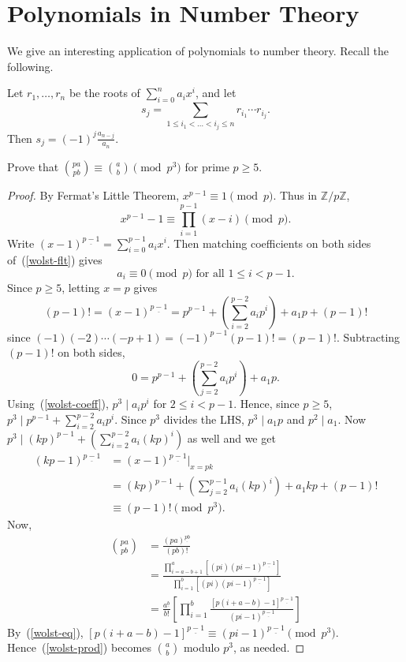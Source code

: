 \section{Polynomials in Number Theory}\label{poly2s3}
We give an interesting application of polynomials to number theory. Recall the following.
\begin{thm}
Let $r_1,\ldots, r_n$ be the roots of $\sum_{i=0}^n a_ix^i$, and let \[s_j=\sum_{1\leq i_1<\ldots<i_j\leq n}r_{i_1}\cdots r_{i_j}.\] Then $s_j=(-1)^j\frac{a_{n-j}}{a_n}$.
\end{thm}
\begin{thm}[Wolstenholme]
Prove that $\binom{pa}{pb}\equiv \binom{a}{b}\pmod{p^3}$ for prime $p\geq 5$.
\end{thm}
\begin{proof}
By Fermat's Little Theorem, $x^{p-1}\equiv 1\pmod{p}$. Thus in $\mathbb{Z}/p\mathbb{Z}$, \begin{equation}
x^{p-1}-1\equiv \prod_{i=1}^{p-1} (x-i)\pmod{p}.\label{wolst-flt}
\end{equation}
Write $(x-1)^{\underline{p-1}}=\sum_{i=0}^{p-1} a_ix^i$. Then matching coefficients on both sides of~(\ref{wolst-flt}) gives
\begin{equation}
a_i\equiv 0\pmod{p}\text{ for all }1\leq i<p-1.
\label{wolst-coeff}
\end{equation}
Since $p\geq 5$, letting $x=p$ gives
\[(p-1)!=(x-1)^{\underline{p-1}}=p^{p-1}+\left(\sum_{i=2}^{p-2} a_ip^i\right)+a_1p+(p-1)!\]
since $(-1)(-2)\cdots (-p+1)=(-1)^{p-1}(p-1)!=(p-1)!$. Subtracting $(p-1)!$ on both sides,
\[0=p^{p-1}+\left(\sum_{j=2}^{p-2} a_ip^i\right)+a_1p.\]
Using~(\ref{wolst-coeff}), $p^3\mid a_ip^i$ for $2\leq i<p-1$. Hence, since $p\geq 5$, $p^3\mid p^{p-1} +\sum_{i=2}^{p-2} a_ip^i$. Since $p^3$ divides the LHS, $p^3\mid a_1p$ and $p^2\mid a_1$. Now  $p^3\mid(kp)^{p-1}+\left( \sum_{i=2}^{p-2} a_i (kp)^i \right)$ as well and we get
\begin{align}
\nonumber(kp-1)^{\underline{p-1}}&=(x-1)^{\underline{p-1}}|_{x=pk}\\
\nonumber&=(kp)^{p-1}+\left(\sum_{j=2}^{p-1} a_i(kp)^i\right)+a_1kp+(p-1)!\\
&\equiv (p-1)!\pmod{p^3}.\label{wolst-eq}
\end{align}
Now,
\begin{align}
\nonumber\binom{pa}{pb}
&=\frac{(pa)^{\underline{pb}}}{(pb)!}\\
\nonumber&=\frac{\prod_{i=a-b+1}^{a}[(pi)(pi-1)^{\underline{p-1}}]}{\prod_{i=1}^b [(pi)(pi-1)^{\underline{p-1}}]}\\
&=\frac{a^{\underline{b}}}{b!} \left[\prod_{i=1}^b \frac{[p(i+a-b)-1]^{\underline{p-1}}}{(pi-1)^{\underline{p-1}}}\right]\label{wolst-prod}
\end{align}
By~(\ref{wolst-eq}), $[p(i+a-b)-1]^{\underline{p-1}}\equiv (pi-1)^{\underline{p-1}}\pmod{p^3}$. Hence~(\ref{wolst-prod}) becomes $\binom{a}{b}$ modulo $p^3$, as needed.
\end{proof}
